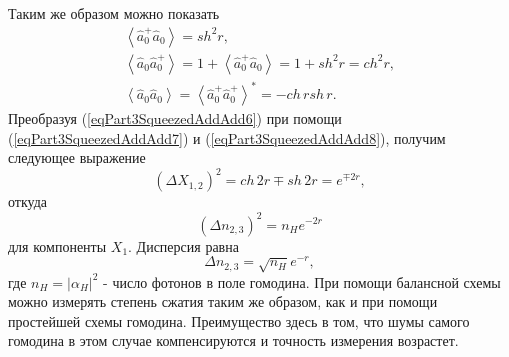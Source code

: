 Таким же образом можно показать
\begin{eqnarray}
\left<\hat{a}_0^{+}\hat{a}_0\right> = sh^2 r,
\nonumber \\
\left<\hat{a}_0\hat{a}_0^{+}\right> = 
1 + \left<\hat{a}_0^{+}\hat{a}_0\right> =
1 + sh^2 r = ch^2 r,
\nonumber \\
\left<\hat{a}_0\hat{a}_0\right> = 
\left<\hat{a}_0^{+}\hat{a}_0^{+}\right>^{*} = - ch\,r sh\,r.
\label{eqPart3SqueezedAddAdd8}
\end{eqnarray}
Преобразуя (\ref{eqPart3SqueezedAddAdd6}) при помощи
(\ref{eqPart3SqueezedAddAdd7}) 
и
(\ref{eqPart3SqueezedAddAdd8}),
получим следующее выражение
\begin{equation}
\left(\Delta X_{1,2}\right)^2 = 
ch\,2 r \mp sh\, 2 r = 
e^{\mp 2 r},
\nonumber
\end{equation}
откуда
\begin{equation}
\left(\Delta n_{2,3}\right)^2 = 
n_H
e^{- 2 r}
\nonumber
\end{equation}
для компоненты $X_1$. Дисперсия равна 
\[
\Delta n_{2,3} = 
\sqrt{n_H}
e^{- r},
\]
где $n_H=\left|\alpha_H\right|^2$ - число фотонов в поле гомодина.
При помощи балансной схемы можно измерять степень сжатия таким же
образом, как и при помощи простейшей схемы гомодина. Преимущество
здесь в том, что шумы самого гомодина в этом случае компенсируются и
точность измерения возрастет.


